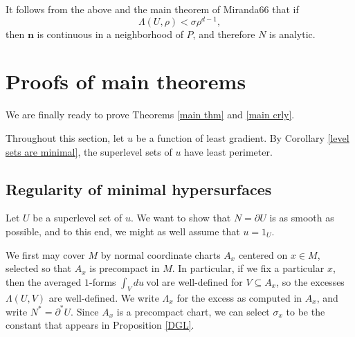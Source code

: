 \documentclass[reqno,12pt,letterpaper]{amsart}
\newcommand{\normal}{\mathbf n}
\newcommand{\vol}{\mathrm{vol}}
\theoremstyle{definition}
\numberwithin{equation}{section}
\begin{document}
It follows from the above and the main theorem of Miranda66 that if
$$\Lambda(U, \rho) < \sigma \rho^{d - 1},$$
then $\normal$ is continuous in a neighborhood of $P$, and therefore $N$ is analytic.




\section{Proofs of main theorems}\label{proof of main thm}
We are finally ready to prove Theorems \ref{main thm} and \ref{main crly}.

Throughout this section, let $u$ be a function of least gradient.
By Corollary \ref{level sets are minimal}, the superlevel sets of $u$ have least perimeter.

\subsection{Regularity of minimal hypersurfaces}
Let $U$ be a superlevel set of $u$.
We want to show that $N = \partial U$ is as smooth as possible, and to this end, we might as well assume that $u = 1_U$.

We first may cover $M$ by normal coordinate charts $A_x$ centered on $x \in M$, selected so that $A_x$ is precompact in $M$.
In particular, if we fix a particular $x$, then the averaged $1$-forms $\int_V du ~\vol$ are well-defined for $V \subseteq A_x$, so the excesses $\Lambda(U, V)$ are well-defined.
We write $\Lambda_x$ for the excess as computed in $A_x$, and write $N^* = \partial^* U$.
Since $A_x$ is a precompact chart, we can select $\sigma_x$ to be the constant that appears in Proposition \ref{DGL}.
\end{document}
